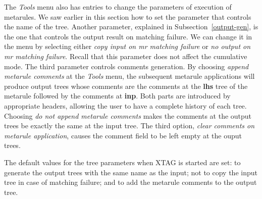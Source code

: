The {\it Tools} menu also has entries to change the parameters of execution of
metarules. We saw earlier in this section how to set the parameter that
controls the name of the tree. Another parameter, explained in
Subsection~\ref{output-gen}, is the one that controls the output result on
matching failure. We can change it in the menu by selecting either {\it copy
input on mr matching failure} or {\it no output on mr matching failure}. Recall
that this parameter does not affect the cumulative mode.  The third parameter
controls comments generation. By choosing {\it append metarule comments} at
the {\it Tools} menu, the subsequent metarule applications will produce output
trees whose comments are the comments at the {\bf lhs} tree of the metarule
followed by the comments at {\bf inp}. Both parts are introduced by appropriate
headers, allowing the user to have a complete history of each tree. Choosing
{\it do not append metarule comments} makes the comments at the output trees
be exactly the same at the input tree. The third option, {\it clear comments on
metarule application}, causes the comment field to be left empty at the ouput
trees.

The default values for the tree parameters when XTAG is started are set:
to generate the output trees with the same name as the input; not to copy
the input tree in case of matching failure; and to add the metarule comments
to the output tree.

